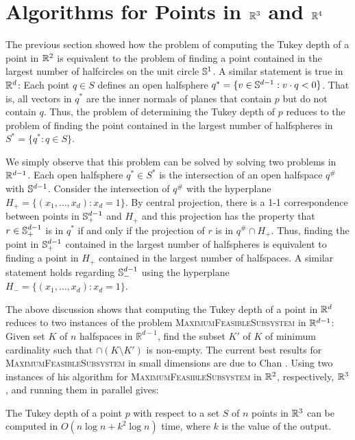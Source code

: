 \documentclass[charterfonts,lotsofwhite]{patmorin}
\begin{document}
\section{Algorithms for Points in $\mathbb{R}^3$ and $\mathbb{R}^4$}

The previous section showed how the problem of computing the Tukey
depth of a point in $\mathbb{R}^2$ is equivalent to the problem of finding a
point contained in the largest number of halfcircles on the unit
circle $\mathbb{S}^1$.  A similar statement is true in $\mathbb{R}^d$:  Each point
$q\in S$ defines an open halfsphere $q^*=\{ v\in\mathbb{S}^{d-1} : v\cdot q <
0\}$.  That is, all vectors in $q^*$ are the inner normals of planes
that contain $p$ but do not contain $q$.  Thus, the problem of
determining the Tukey depth of $p$ reduces to the problem of finding
the point contained in the largest number of halfspheres in $S^*=\{q^*
: q\in S\}$.

We simply observe that this problem can be solved by solving two
problems in $\mathbb{R}^{d-1}$.  Each open halfsphere $q^*\in S^*$ is the
intersection of an open halfspace $q^\#$ with $\mathbb{S}^{d-1}$.  Consider
the intersection of $q^\#$ with the hyperplane
$H_+=\{(x_1,\ldots,x_d):x_d=1\}$.  By central projection, there is a
1-1 correspondence between points in $\mathbb{S}^{d-1}_+$ and $H_+$ and this
projection has the property that $r\in\mathbb{S}^{d-1}_+$ is in $q^*$ if and
only if the projection of $r$ is in $q^\#\cap H_+$.  Thus, finding the
point in $\mathbb{S}^{d-1}_+$ contained in the largest number of halfspheres
is equivalent to finding a point in $H_+$ contained in the largest
number of halfspaces.  A similar statement holds regarding
$\mathbb{S}^{d-1}_-$ using the hyperplane $H_-=\{(x_1,\ldots,x_d):x_d=1\}$.

The above discussion shows that computing the Tukey depth of a point
in $\mathbb{R}^d$ reduces to two instances of the problem
\textsc{MaximumFeasibleSubsystem} in $\mathbb{R}^{d-1}$: Given set $K$ of $n$
halfspaces in $\mathbb{R}^{d-1}$, find the subset $K'$ of $K$ of
minimum cardinality such that $\cap (K\setminus K')$ is non-empty.
The current best results for \textsc{MaximumFeasibleSubsystem} in
small dimensions are due to Chan \cite{c04}.  Using two instances of
his algorithm for \textsc{MaximumFeasibleSubsystem} in $\mathbb{R}^2$,
respectively, $\mathbb{R}^3$, and running them in parallel gives:

\begin{thm}
The Tukey depth of a point $p$ with respect to a set $S$ of $n$ points
in $\mathbb{R}^3$ can be computed in $O(n\log n + k^2\log n)$ time, where
$k$ is the value of the output.
\end{thm}
\end{document}
